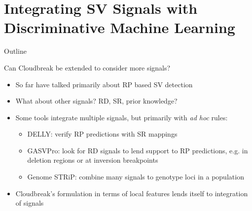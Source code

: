 \documentclass{beamer}
\begin{document}
\section{Integrating SV Signals with Discriminative Machine Learning}
\begin{frame}{Outline}
  \tableofcontents[currentsection]
\end{frame}

\begin{frame}{Can Cloudbreak be extended to consider more signals?}
  \begin{itemize}
    \item So far have talked primarily about RP based SV detection
    \item What about other signals? RD, SR, prior knowledge?
    \item Some tools integrate multiple signals, but primarily with \emph{ad hoc} rules:
      \begin{itemize}
        \item DELLY: verify RP predictions with SR mappings
        \item GASVPro: look for RD signals to lend support to RP predictions, e.g. in deletion regions or at inversion breakpoints
        \item Genome STRiP: combine many signals to genotype loci in a population
      \end{itemize}
     \item Cloudbreak's formulation in terms of local features lends itself to integration of signals
  \end{itemize}
\end{frame}
\end{document}
